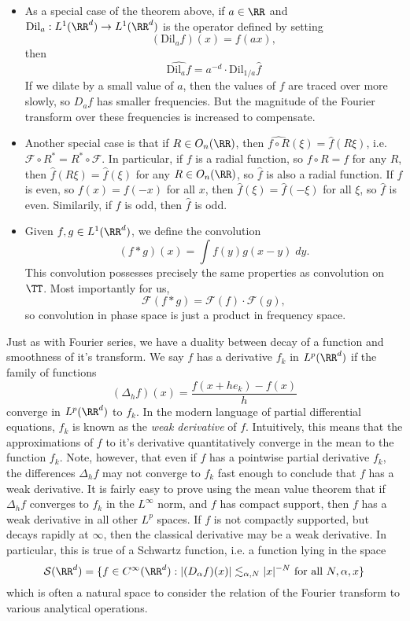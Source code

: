 \begin{itemize}
    \item As a special case of the theorem above, if $a \in \RR$ and $\text{Dil}_a: L^1(\RR^d) \to L^1(\RR^d)$ is the operator defined by setting
    \[ (\text{Dil}_a f)(x) = f(ax), \]
    then
    \[ \widehat{\text{Dil}_a f} = a^{-d} \cdot \text{Dil}_{1/a}\widehat{f} \]
    If we dilate by a small value of $a$, then the values of $f$ are traced over more slowly, so $D_a f$ has smaller frequencies. But the magnitude of the Fourier transform over these frequencies is increased to compensate.

    \item Another special case is that if $R \in O_n(\RR)$, then $\widehat{f \circ R}(\xi) = \widehat{f}(R \xi)$, i.e. $\mathcal{F} \circ R^* = R^* \circ \mathcal{F}$. In particular, if $f$ is a radial function, so $f \circ R = f$ for any $R$, then $\widehat{f}(R \xi) = \widehat{f}(\xi)$ for any $R \in O_n(\RR)$, so $\widehat{f}$ is also a radial function. If $f$ is even, so $f(x) = f(-x)$ for all $x$, then $\widehat{f}(\xi) = \widehat{f}(-\xi)$ for all $\xi$, so $\widehat{f}$ is even. Similarily, if $f$ is odd, then $\widehat{f}$ is odd.

    \item Given $f,g \in L^1(\RR^d)$, we define the convolution
    \[ (f * g)(x) = \int f(y) g(x-y)\; dy. \]
    This convolution possesses precisely the same properties as convolution on $\TT$. Most importantly for us,
    \[ \mathcal{F}(f * g) = \mathcal{F}(f) \cdot \mathcal{F}(g), \]
    so convolution in phase space is just a product in frequency space.
\end{itemize}

Just as with Fourier series, we have a duality between decay of a function and smoothness of it's transform. We say $f$ has a derivative $f_k$ in $L^p(\RR^d)$ if the family of functions
%
\[ (\Delta_h f)(x) = \frac{f(x + h e_k) - f(x)}{h} \]
%
converge in $L^p(\RR^d)$ to $f_k$. In the modern language of partial differential equations, $f_k$ is known as the \emph{weak derivative} of $f$. Intuitively, this means that the approximations of $f$ to it's derivative quantitatively converge in the mean to the function $f_k$. Note, however, that even if $f$ has a pointwise partial derivative $f_k$, the differences $\Delta_h f$ may not converge to $f_k$ fast enough to conclude that $f$ has a weak derivative. It is fairly easy to prove using the mean value theorem that if $\Delta_h f$ converges to $f_k$ in the $L^\infty$ norm, and $f$ has compact support, then $f$ has a weak derivative in all other $L^p$ spaces. If $f$ is not compactly supported, but decays rapidly at $\infty$, then the classical derivative may be a weak derivative. In particular, this is true of a Schwartz function, i.e. a function lying in the space
%
\[ \mathcal{S}(\RR^d) = \{ f \in C^\infty(\RR^d): |(D_\alpha f)(x)| \lesssim_{\alpha,N} |x|^{-N}\ \text{for all $N, \alpha, x$} \} \]
%
which is often a natural space to consider the relation of the Fourier transform to various analytical operations.


